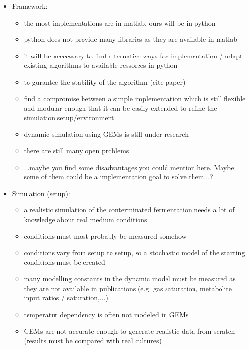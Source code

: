 \begin{itemize}
 \item Framework:
 \begin{itemize}
  \item the most implementations are in matlab, ours will be in python
  \item python does not provide many libraries as they are available in matlab
  \item it will be neccessary to find alternative ways for implementation / adapt existing algorithms to available ressorces in python
  \item to gurantee the stability of the algorithm (cite paper)
  \item find a compromise between a simple implementation which is still flexible and modular enough that it can be easily extended to refine the simulation setup/environment
  \item dynamic simulation using GEMs is still under research
  \item there are still many open problems
  \item ...maybe you find some disadvantages you could mention here. Maybe some of them could be a implementation goal to solve them...?
 \end{itemize}
 \item Simulation (setup):
 \begin{itemize}
  \item a realistic simulation of the conterminated fermentation needs a lot of knowledge about real medium conditions
  \item conditions must most probably be measured somehow
  \item conditions vary from setup to setup, so a stochastic model of the starting conditions must be created
  \item many modelling constants in the dynamic model must be measured as they are not available in publications (e.g. gas saturation, metabolite input ratios / saturation,...)
  \item temperatur dependency is often not modeled in GEMs
  \item GEMs are not accurate enough to generate realistic data from scratch (results must be compared with real cultures)
 \end{itemize}
\end{itemize}